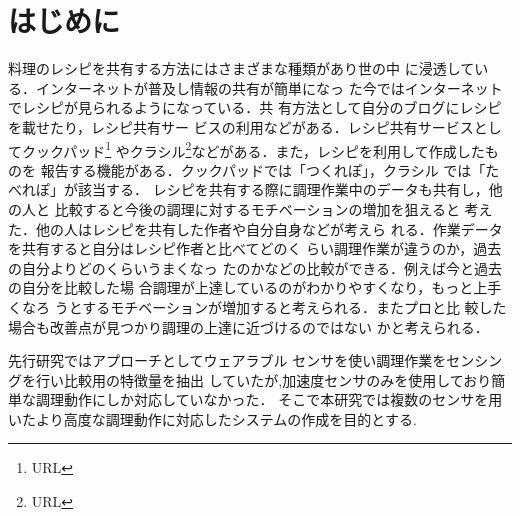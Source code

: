 \section{はじめに}
料理のレシピを共有する方法にはさまざまな種類があり世の中
に浸透している．インターネットが普及し情報の共有が簡単になっ
た今ではインターネットでレシピが見られるようになっている．共
有方法として自分のブログにレシピを載せたり，レシピ共有サー
ビスの利用などがある．レシピ共有サービスとしてクックパッド\footnote{URL}
やクラシル\footnote{URL}などがある．また，レシピを利用して作成したものを
報告する機能がある．クックパッドでは「つくれぽ」，クラシル
では「たべれぽ」が該当する．
レシピを共有する際に調理作業中のデータも共有し，他の人と
比較すると今後の調理に対するモチベーションの増加を狙えると
考えた．他の人はレシピを共有した作者や自分自身などが考えら
れる．作業データを共有すると自分はレシピ作者と比べてどのく
らい調理作業が違うのか，過去の自分よりどのくらいうまくなっ
たのかなどの比較ができる．例えば今と過去の自分を比較した場
合調理が上達しているのがわかりやすくなり，もっと上手くなろ
うとするモチベーションが増加すると考えられる．またプロと比
較した場合も改善点が見つかり調理の上達に近づけるのではない
かと考えられる．

先行研究ではアプローチとしてウェアラブル
センサを使い調理作業をセンシングを行い比較用の特徴量を抽出
していたが,加速度センサのみを使用しており簡単な調理動作にしか対応していなかった．
そこで本研究では複数のセンサを用いたより高度な調理動作に対応したシステムの作成を目的とする.